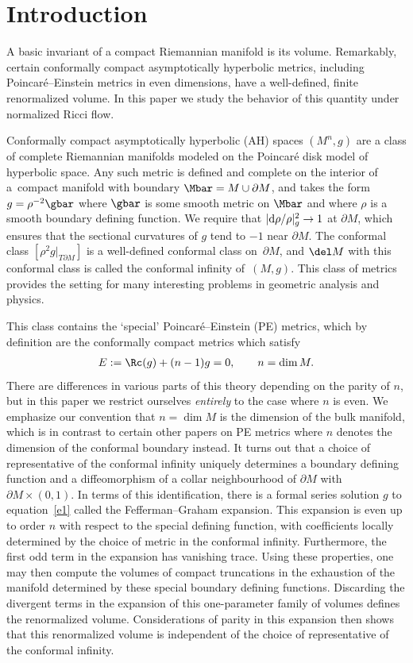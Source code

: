 \section{Introduction}

A basic invariant of a compact Riemannian manifold is its volume. Remarkably, certain conformally compact
asymptotically hyperbolic metrics, including Poincar\'e--Einstein metrics in even dimensions, have a well-defined,
finite renormalized volume. In this paper we study the behavior of this quantity under normalized Ricci flow.

Conformally compact asymptotically hyperbolic (AH) spaces $(M^n, g)$ are a class of complete Riemannian manifolds modeled on the Poincar\'e disk model of hyperbolic space. Any such metric is defined and complete on the interior of a~compact manifold with boundary $\Mbar = M \cup \partial M$, and takes the form $g = \rho^{-2} \gbar$ where $\gbar$ is some smooth metric on $\Mbar$ and where $\rho$ is a smooth boundary defining function. We require that $|{\rm d}\rho/\rho|^2_g \to 1$ at $\partial M$, which ensures that the sectional curvatures of $g$ tend to $-1$ near $\partial M$. The conformal class $[\rho^2 g |_{T\partial M}]$ is a well-defined conformal class on~$\partial M$, and $\del M$ with this conformal class is called the conformal infinity of~$(M,g)$. This class of metrics provides the setting for many interesting problems in geometric analysis and physics.

This class contains the `special' Poincar\'e--Einstein (PE) metrics, which by definition are the conformally compact metrics which satisfy
\begin{gather} \label{e1}
E := \Rc(g) + (n-1)g = 0,\qquad n = \dim M.
\end{gather}
There are differences in various parts of this theory depending on the parity of $n$, but in this paper we restrict ourselves
{\it entirely} to the case where $n$ is even. We emphasize our convention that $n = \dim M$ is the dimension of the bulk manifold,
which is in contrast to certain other papers on PE metrics where $n$ denotes the dimension of the conformal boundary instead.
It turns out that a choice of representative of the conformal infinity uniquely determines a boundary defining function and
a diffeomorphism of a collar neighbourhood of $\partial M$ with $\partial M \times (0,1)$. In terms of this identification,
there is a formal series solution $g$ to equation~\eqref{e1} called the Fefferman--Graham expansion. This expansion is
even up to order $n$ with respect to the special defining function, with coefficients locally determined by the choice of metric
in the conformal infinity. Furthermore, the first odd term in the expansion has vanishing trace. Using these properties,
one may then compute the volumes of compact truncations in the exhaustion of the manifold determined by these special
boundary defining functions. Discarding the divergent terms in the expansion of this one-parameter family of volumes
defines the renormalized volume. Considerations of parity in this expansion then shows that this renormalized volume
is independent of the choice of representative of the conformal infinity.

